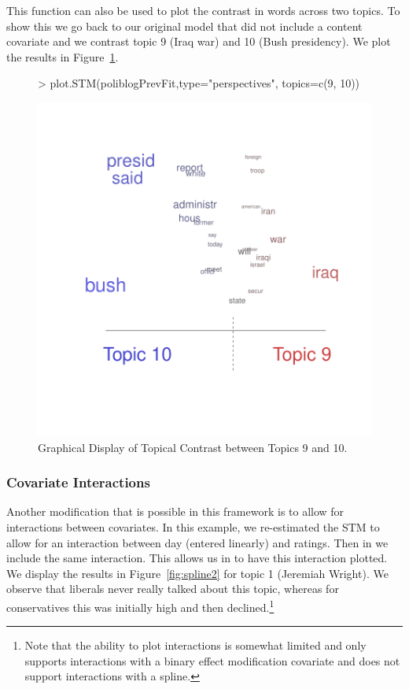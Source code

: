 \documentclass[nojss]{jss}
\begin{document}
This function can also be used to plot the contrast in words across two topics. To show this we go back to our original model that did not include a content covariate and we contrast topic 9 (Iraq war) and 10 (Bush presidency). We plot the results in Figure~\ref{fig:perp2}.
\begin{figure}[t!]
\begin{center}
\begin{Schunk}
\begin{Sinput}
> plot.STM(poliblogPrevFit,type="perspectives", topics=c(9, 10))
\end{Sinput}
\end{Schunk}
\includegraphics{stmVignette-017}
\caption{Graphical Display of Topical Contrast between Topics 9 and 10.}
\label{fig:perp2}
\end{center}
\end{figure}

\subsubsection{Covariate Interactions}

Another modification that is possible in this framework is to allow for interactions between covariates. In this example, we re-estimated the STM to allow for an interaction between day (entered linearly) and ratings. Then in  we include the same interaction. This allows us in  to have this interaction plotted. We display the results in Figure~\ref{fig:spline2} for topic 1 (Jeremiah Wright). We observe that liberals never really talked about this topic, whereas for conservatives this was initially high and then declined.\footnote{Note that the ability to plot interactions is somewhat limited and only supports interactions with a binary effect modification covariate and does not support interactions with a spline.}
\end{document}
